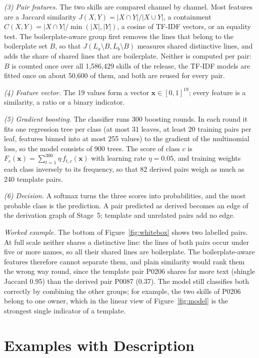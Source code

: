 \documentclass[sigconf,screen]{acmart}
\begin{document}
\emph{(3) Pair features.} The two skills are compared channel by channel. Most features are a Jaccard similarity $J(X,Y)=|X\cap Y|/|X\cup Y|$, a containment $C(X,Y)=|X\cap Y|/\min(|X|,|Y|)$, a cosine of TF-IDF vectors, or an equality test. The boilerplate-aware group first removes the lines that belong to the boilerplate set $B$, so that $J(L_a\setminus B, L_b\setminus B)$ measures shared distinctive lines, and adds the share of shared lines that are boilerplate. Neither is computed per pair: $B$ is counted once over all 1,586,429 skills of the release, the TF-IDF models are fitted once on about 50,600 of them, and both are reused for every pair.

\emph{(4) Feature vector.} The 19 values form a vector $\mathbf{x}\in[0,1]^{19}$; every feature is a similarity, a ratio or a binary indicator.

\emph{(5) Gradient boosting.} The classifier runs 300 boosting rounds. In each round it fits one regression tree per class (at most 31 leaves, at least 20 training pairs per leaf, features binned into at most 255 values) to the gradient of the multinomial loss, so the model consists of 900 trees. The score of class $c$ is $F_c(\mathbf{x})=\sum_{t=1}^{300}\eta\,f_{t,c}(\mathbf{x})$ with learning rate $\eta=0.05$, and training weights each class inversely to its frequency, so that 82 derived pairs weigh as much as 240 template pairs.

\emph{(6) Decision.} A softmax turns the three scores into probabilities, and the most probable class is the prediction. A pair predicted as derived becomes an edge of the derivation graph of Stage~5; template and unrelated pairs add no edge.

\emph{Worked example.} The bottom of Figure~\ref{fig:whitebox} shows two labelled pairs. At full scale neither shares a distinctive line: the lines of both pairs occur under five or more names, so all their shared lines are boilerplate. The boilerplate-aware features therefore cannot separate them, and plain similarity would rank them the wrong way round, since the template pair P0206 shares far more text (shingle Jaccard 0.95) than the derived pair P0087 (0.37). The model still classifies both correctly by combining the other groups; for example, the two skills of P0206 belong to one owner, which in the linear view of Figure~\ref{fig:model} is the strongest single indicator of a template.


\section{Examples with Description}
\label{sec:examples}
 
\end{document}
